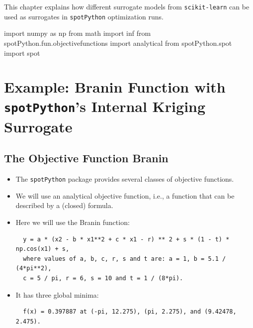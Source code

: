 \documentclass[
  letterpaper,
  DIV=11,
  numbers=noendperiod]{scrreprt}
\newenvironment{Shaded}{\begin{snugshade}}{\end{snugshade}}
\newcommand{\ImportTok}[1]{\textcolor[rgb]{0.00,0.46,0.62}{#1}}
\newcommand{\NormalTok}[1]{\textcolor[rgb]{0.00,0.23,0.31}{#1}}
\begin{document}
This chapter explains how different surrogate models from
\texttt{scikit-learn} can be used as surrogates in \texttt{spotPython}
optimization runs.

\begin{Shaded}
\begin{Highlighting}[]
\ImportTok{import}\NormalTok{ numpy }\ImportTok{as}\NormalTok{ np}
\ImportTok{from}\NormalTok{ math }\ImportTok{import}\NormalTok{ inf}
\ImportTok{from}\NormalTok{ spotPython.fun.objectivefunctions }\ImportTok{import}\NormalTok{ analytical}
\ImportTok{from}\NormalTok{ spotPython.spot }\ImportTok{import}\NormalTok{ spot}
\end{Highlighting}
\end{Shaded}

\hypertarget{example-branin-function-with-spotpythons-internal-kriging-surrogate}{%
\section{\texorpdfstring{Example: Branin Function with
\texttt{spotPython}'s Internal Kriging
Surrogate}{Example: Branin Function with spotPython's Internal Kriging Surrogate}}\label{example-branin-function-with-spotpythons-internal-kriging-surrogate}}

\hypertarget{the-objective-function-branin}{%
\subsection{The Objective Function
Branin}\label{the-objective-function-branin}}

\begin{itemize}
\item
  The \texttt{spotPython} package provides several classes of objective
  functions.
\item
  We will use an analytical objective function, i.e., a function that
  can be described by a (closed) formula.
\item
  Here we will use the Branin function:

\begin{verbatim}
  y = a * (x2 - b * x1**2 + c * x1 - r) ** 2 + s * (1 - t) * np.cos(x1) + s,
  where values of a, b, c, r, s and t are: a = 1, b = 5.1 / (4*pi**2),
  c = 5 / pi, r = 6, s = 10 and t = 1 / (8*pi).
\end{verbatim}
\item
  It has three global minima:

\begin{verbatim}
  f(x) = 0.397887 at (-pi, 12.275), (pi, 2.275), and (9.42478, 2.475).
\end{verbatim}
\end{itemize}
\end{document}
